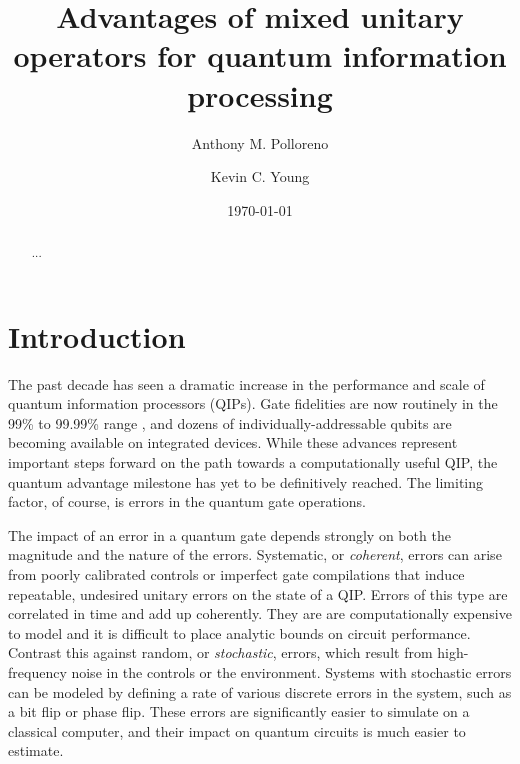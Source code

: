 \documentclass[aps,nofootinbib,pra,notitlepage,twocolumn]{revtex4-1}
\begin{document}
\title{Advantages of mixed unitary operators for quantum information processing}

\author{Anthony M. Polloreno}

\author{Kevin C. Young}

\date{\today}

\begin{abstract}
...
\end{abstract}

\pacs{}

\maketitle


\section{Introduction}
\label{sec:introduction}

The past decade has seen a dramatic increase in the performance and scale of quantum information processors (QIPs). Gate fidelities are now routinely in the 99\% to 99.99\% range \cite{Barends2014, Ballance2016}, and dozens of individually-addressable qubits are becoming available on integrated devices. While these advances represent important steps forward on the path towards a computationally useful QIP, the quantum advantage milestone \cite{1203.5813} has yet to be definitively reached. The limiting factor, of course, is errors in the quantum gate operations.

The impact of an error in a quantum gate depends strongly on both the magnitude and the nature of the errors. Systematic, or \emph{coherent}, errors can arise from poorly calibrated controls or imperfect gate compilations that induce repeatable, undesired unitary errors on the state of a QIP. Errors of this type are correlated in time and add up coherently. They are are  computationally expensive to model and it is difficult to place analytic bounds on circuit performance. Contrast this against random, or \emph{stochastic}, errors, which result from high-frequency noise in the controls or the environment. Systems with stochastic errors can be  modeled by defining a rate of various discrete errors in the system, such as a bit flip or phase flip. These errors are significantly easier to simulate on a classical computer, and their impact on quantum circuits is much easier to estimate.
\end{document}
